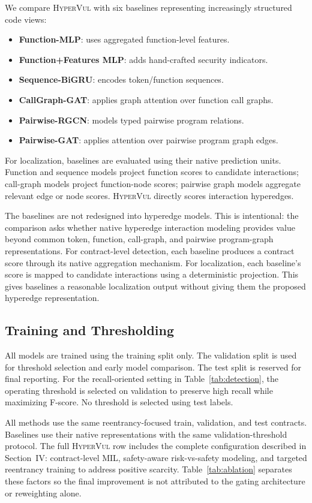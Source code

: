 \documentclass[conference]{IEEEtran}
\newcommand{\tool}{\textsc{HyperVul}}
\begin{document}
We compare \tool{} with six baselines representing increasingly structured code views:
\begin{itemize}
    \item \textbf{Function-MLP}: uses aggregated function-level features.
    \item \textbf{Function+Features MLP}: adds hand-crafted security indicators.
    \item \textbf{Sequence-BiGRU}: encodes token/function sequences.
    \item \textbf{CallGraph-GAT}: applies graph attention over function call graphs.
    \item \textbf{Pairwise-RGCN}: models typed pairwise program relations.
    \item \textbf{Pairwise-GAT}: applies attention over pairwise program graph edges.
\end{itemize}
For localization, baselines are evaluated using their native prediction units. Function and sequence models project function scores to candidate interactions; call-graph models project function-node scores; pairwise graph models aggregate relevant edge or node scores. \tool{} directly scores interaction hyperedges.

The baselines are not redesigned into hyperedge models. This is intentional: the comparison asks whether native hyperedge interaction modeling provides value beyond common token, function, call-graph, and pairwise program-graph representations. For contract-level detection, each baseline produces a contract score through its native aggregation mechanism. For localization, each baseline's score is mapped to candidate interactions using a deterministic projection. This gives baselines a reasonable localization output without giving them the proposed hyperedge representation.

\subsection{Training and Thresholding}

All models are trained using the training split only. The validation split is used for threshold selection and early model comparison. The test split is reserved for final reporting. For the recall-oriented setting in Table~\ref{tab:detection}, the operating threshold is selected on validation to preserve high recall while maximizing F-score. No threshold is selected using test labels.

All methods use the same reentrancy-focused train, validation, and test contracts. Baselines use their native representations with the same validation-threshold protocol. The full \tool{} row includes the complete configuration described in Section~IV: contract-level MIL, safety-aware risk-vs-safety modeling, and targeted reentrancy training to address positive scarcity. Table~\ref{tab:ablation} separates these factors so the final improvement is not attributed to the gating architecture or reweighting alone.
\end{document}
